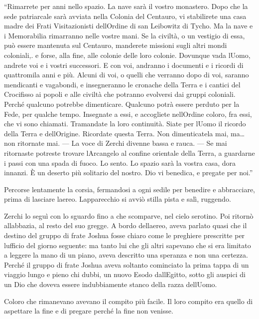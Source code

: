 ``Rimarrete per anni nello spazio. La nave sarà il vostro monastero.
Dopo che la sede patriarcale sarà avviata nella Colonia del Centauro, vi
stabilirete una casa madre dei Frati Visitazionisti
dell\textquotesingle Ordine di san Leibowitz di Tycho. Ma la nave e i
Memorabilia rimarranno nelle vostre mani. Se la civiltà, o un vestigio
di essa, può essere mantenuta sul Centauro, manderete missioni sugli
altri mondi coloniali,. e forse, alla fine, alle colonie delle loro
colonie. Dovunque vada l\textquotesingle Uomo, andrete voi e i vostri
successori. E con voi, andranno i documenti e i ricordi di quattromila
anni e più. Alcuni di voi, o quelli che verranno dopo di voi, saranno
mendicanti e vagabondi, e insegneranno le cronache della Terra e i
cantici del Crocifisso ai popoli e alle civiltà che potranno evolversi
dai gruppi coloniali. Perché qualcuno potrebbe dimenticare. Qualcuno
potrà essere perduto per la Fede, per qualche tempo. Insegnate a essi, e
accogliete nell\textquotesingle Ordine coloro, fra essi, che vi sono
chiamati. Tramandate la loro continuità. Siate per
l\textquotesingle Uomo il ricordo della Terra e
dell\textquotesingle Origine. Ricordate questa Terra. Non dimenticatela
mai, ma\ldots{} non ritornate mai. --- La voce di Zerchi divenne bassa e
rauca. --- Se mai ritornaste potreste trovare
l\textquotesingle Arcangelo al confine orientale della Terra, a
guardarne i passi con una spada di fuoco. Lo sento. Lo spazio sarà la
vostra casa, d\textquotesingle ora innanzi. È un deserto più solitario
del nostro. Dio vi benedica, e pregate per noi.''

Percorse lentamente la corsia, fermandosi a ogni sedile per benedire e
abbracciare, prima di lasciare l\textquotesingle aereo.
L\textquotesingle apparecchio si avviò stilla pista e salì, ruggendo.

Zerchi lo seguì con lo sguardo fino a che scomparve, nel cielo serotino.
Poi ritornò all\textquotesingle abbazia, al resto del suo gregge. A
bordo dell\textquotesingle aereo, aveva parlato quasi che il destino del
gruppo di frate Joshua fosse chiaro come le preghiere prescritte per
l\textquotesingle ufficio del giorno seguente: ma tanto lui che gli
altri sapevano che si era limitato a leggere la mano di un piano, aveva
descritto una speranza e non una certezza. Perché il gruppo di frate
Joshua aveva soltanto cominciato la prima tappa di un viaggio lungo e
pieno chi dubbi, un nuovo Esodo dall\textquotesingle Egitto, sotto gli
auspici di un Dio che doveva essere indubbiamente stanco della razza
dell\textquotesingle Uomo.

Coloro che rimanevano avevano il compito più facile. Il loro compito era
quello di aspettare la fine e di pregare perché la fine non venisse.
